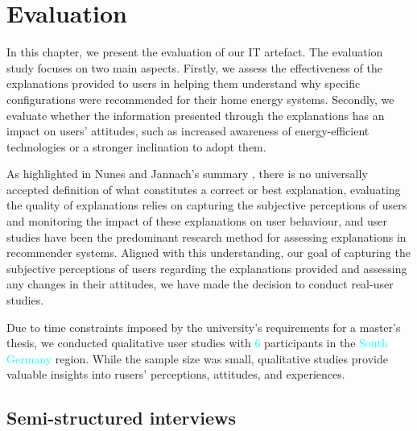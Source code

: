 \chapter{Evaluation}

In this chapter, we present the evaluation of our IT artefact. 
The evaluation study focuses on two main aspects. 
Firstly, we assess the effectiveness of the explanations provided to users in helping them understand why specific configurations were recommended for their home energy systems.
Secondly, we evaluate whether the information presented through the explanations has an impact on users' attitudes, such as increased awareness of energy-efficient technologies or a stronger inclination to adopt them. 
 
As highlighted in Nunes and Jannach's summary \cite{Nunes2020}, 
there is no universally accepted definition of what constitutes a correct or best explanation, 
evaluating the quality of explanations relies on capturing the subjective perceptions of users and monitoring the impact of these explanations on user behaviour, 
and user studies have been the predominant research method for assessing explanations in recommender systems.
Aligned with this understanding, our goal of capturing the subjective perceptions of users regarding the explanations provided and assessing any changes in their attitudes, 
we have made the decision to conduct real-user studies. 

Due to time constraints imposed by the university's requirements for a master's thesis, we conducted qualitative user studies with \textcolor{cyan}{6} participants in the \textcolor{cyan}{South Germany} region. 
While the sample size was small, qualitative studies provide valuable insights into rusers' perceptions, attitudes, and experiences.


\section{Semi-structured interviews}

